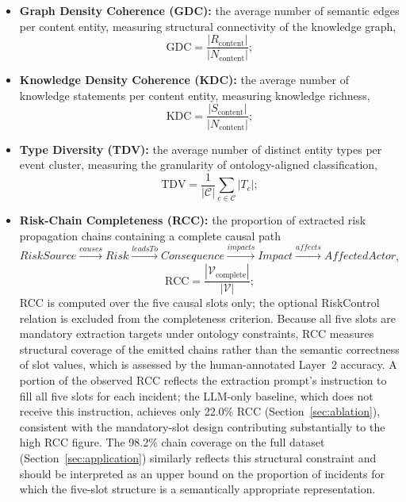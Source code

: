 \documentclass[a4paper,fleqn]{cas-dc}
\begin{document}
\begin{itemize}

  \item \textbf{Graph Density Coherence (GDC):}
        the average number of semantic edges per content entity,
        measuring structural connectivity of the knowledge graph,
        \begin{equation}
          \text{GDC} =
          \frac{|R_{\text{content}}|}{|N_{\text{content}}|};
        \end{equation}

  \item \textbf{Knowledge Density Coherence (KDC):}
        the average number of knowledge statements per content
        entity, measuring knowledge richness,
        \begin{equation}
          \text{KDC} =
          \frac{|S_{\text{content}}|}{|N_{\text{content}}|};
        \end{equation}

  \item \textbf{Type Diversity (TDV):}
        the average number of distinct entity types per event cluster,
        measuring the granularity of ontology-aligned
        classification,
        \begin{equation}
          \text{TDV} =
          \frac{1}{|\mathcal{C}|}\sum_{c \in \mathcal{C}} |T_c|;
        \end{equation}

  \item \textbf{Risk-Chain Completeness (RCC):}
        the proportion of extracted risk propagation chains
        containing a complete causal path
        $\textit{RiskSource} \xrightarrow{\textit{causes}}
         \textit{Risk} \xrightarrow{\textit{leadsTo}}
         \textit{Consequence} \xrightarrow{\textit{impacts}}
         \textit{Impact} \xrightarrow{\textit{affects}}
         \textit{AffectedActor}$,
        \begin{equation}
          \text{RCC} =
          \frac{|\mathcal{V}_{\text{complete}}|}{|\mathcal{V}|};
        \end{equation}
        RCC is computed over the five causal slots only; the optional
        RiskControl relation is excluded from the completeness criterion.
        Because all five slots are mandatory extraction targets under
        ontology constraints, RCC measures structural coverage of the
        emitted chains rather than the semantic correctness of slot
        values, which is assessed by the human-annotated Layer~2
        accuracy.
        A portion of the observed RCC reflects the extraction prompt's
        instruction to fill all five slots for each incident; the
        LLM-only baseline, which does not receive this instruction,
        achieves only 22.0\% RCC (Section~\ref{sec:ablation}),
        consistent with the mandatory-slot design contributing
        substantially to the high RCC figure.
        The 98.2\% chain coverage on the full dataset
        (Section~\ref{sec:application}) similarly reflects this
        structural constraint and should be interpreted as an upper
        bound on the proportion of incidents for which the five-slot
        structure is a semantically appropriate representation.


\end{itemize}
\end{document}
